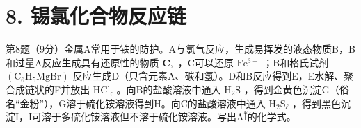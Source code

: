 \section*{8. 锡氯化合物反应链}
第8题（9分）⾦属A常⽤于铁的防护。A与氯⽓反应，⽣成易挥发的液态物质B，B和过量A反应⽣成具有还原性的物质 $\mathbf { C } ,$ ，C可以还原 $\mathrm { F e ^ { 3 + } }$ ；B和格⽒试剂 $\mathrm { ( C _ { 6 } H _ { 5 } M g B r ) }$ 反应⽣成D（只含元素A、碳和氢）。D和B反应得到E，E⽔解、聚合成链状的F并放出 $\mathrm { H C l } _ { \mathfrak { c } }$ 。向B的盐酸溶液中通⼊ $\mathrm { H } _ { 2 } \mathrm { S }$ ，得到⾦⻩⾊沉淀G（俗名“⾦粉”），G溶于硫化铵溶液得到H。向C的盐酸溶液中通⼊ $\mathrm { H } _ { 2 } \mathrm { S } _ { \mathrm { \ell } }$ ，得到⿊⾊沉淀I，I可溶于多硫化铵溶液但不溶于硫化铵溶液。写出A\~I的化学式。
